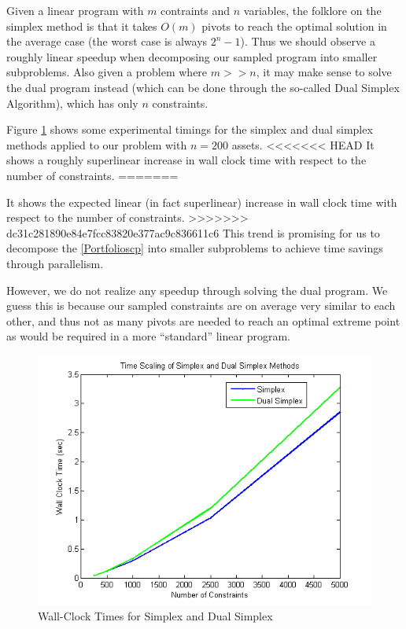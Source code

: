 \documentclass[12pt]{article}
\begin{document}
Given a linear program with $m$ contraints and $n$ variables, the folklore on the simplex method is that it takes $O(m)$ pivots to reach the optimal solution in the average case (the worst case is always $2^n - 1$).
Thus we should observe a roughly linear speedup when decomposing our sampled program into smaller subproblems.
Also given a problem where $m >> n$, it may make sense to solve the dual program instead (which can be done through the so-called Dual Simplex Algorithm), which has only $n$ constraints.

Figure \ref{fig:fig_simplex_time} shows some experimental timings for the simplex and dual simplex methods applied to our problem with $n = 200$ assets.
<<<<<<< HEAD
It shows a roughly superlinear increase in wall clock time with respect to the number of constraints.
=======

It shows the expected linear (in fact superlinear) increase in wall clock time with respect to the number of constraints.
>>>>>>> dc31c281890e84e7fcc83820e377ac9c836611c6
This trend is promising for us to decompose the \ref{Portfolioscp} into smaller subproblems to achieve time savings through parallelism.

However, we do not realize any speedup through solving the dual program.  
We guess this is because our sampled constraints are on average very similar to each other, and thus not as many pivots are needed to reach an optimal extreme point as would be required in a more ``standard'' linear program.

\begin{figure}[ht]
	\centering
		\includegraphics{../plot/figs/fig_simplex_time.png}
	\caption{Wall-Clock Times for Simplex and Dual Simplex}
	\label{fig:fig_simplex_time}
\end{figure}
\end{document}
